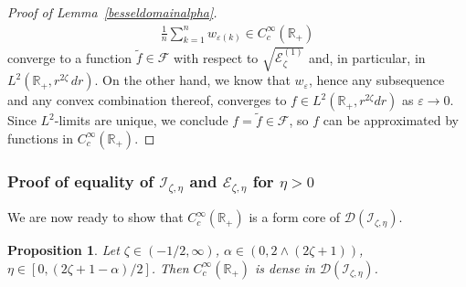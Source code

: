 \documentclass[12pt,reqno]{amsart}
\newtheorem{proposition}[theorem]{Proposition}
\theoremstyle{definition}
\theoremstyle{remark}
\newtheorem{remark}[theorem]{Remark}
\numberwithin{equation}{section}
\newcommand{\1}{\mathbbm{1}}
\newcommand{\D}{\mathcal{D}}
\renewcommand{\epsilon}{\varepsilon}
\newcommand{\F}{\mathcal{F}}
\newcommand{\R}{\mathbb{R}}
\def\ce{\mathcal{E}}
\def\ci{\mathcal{I}}
\begin{document}
\begin{proof}[Proof of Lemma~\ref{besseldomainalpha}]
  \begin{align*}
    \frac1n \sum_{k=1}^n w_{\epsilon(k)} \in C_c^\infty(\R_+)
  \end{align*}
  converge to a function $\tilde f\in\F$ with respect to $\sqrt{\ce_\zeta^{(1)}}$ and, in particular, in $L^2(\R_+,r^{2\zeta}\,dr)$. On the other hand, we know that $w_\epsilon$, hence any subsequence and any convex combination thereof, converges to $f\in L^2(\R_+,r^{2\zeta}dr)$ as $\epsilon\to0$. Since $L^2$-limits are unique, we conclude $f=\tilde f\in \F$, so $f$ can be approximated by functions in $C_c^\infty(\R_+)$.
\end{proof}

\subsubsection{Proof of equality of $\ci_{\zeta,\eta}$ and $\ce_{\zeta,\eta}$ for $\eta>0$}

We are now ready to show that $C_c^\infty(\R_+)$ is a form core of $\D(\ci_{\zeta,\eta})$.
\begin{proposition}
  \label{smoothdensehardy}
  Let $\zeta\in(-1/2,\infty)$, $\alpha\in(0,2\wedge(2\zeta+1))$, $\eta\in[0,(2\zeta+1-\alpha)/2]$.
  Then $C_c^\infty(\R_+)$ is dense in $\D(\ci_{\zeta,\eta})$.
\end{proposition}
\end{document}
